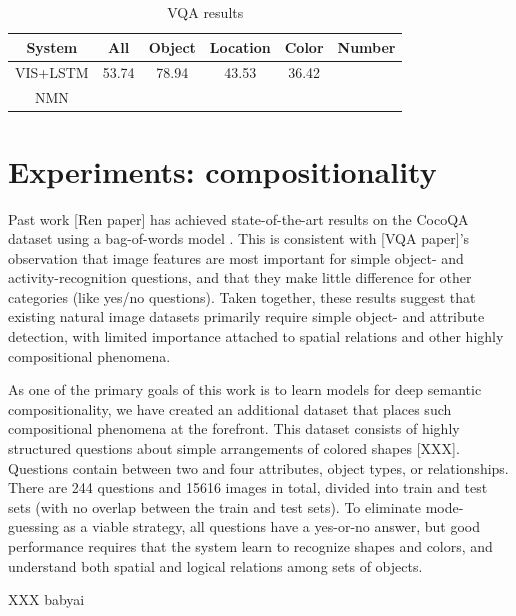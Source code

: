 \documentclass[10pt,twocolumn,letterpaper]{article}
\begin{document}
\begin{table}
  \footnotesize
  \center
  \begin{tabular}{cccccc}
    \toprule
    System & All & Object & Location & Color & Number \\
    \midrule
    VIS+LSTM & 53.74 & 78.94 & 43.53 & 36.42 & \\
    NMN \\
    \bottomrule
  \end{tabular}
  \caption{VQA results}
\end{table}


\section{Experiments: compositionality}

Past work [Ren paper] has achieved state-of-the-art results on the CocoQA
dataset using a bag-of-words model . This is consistent with [VQA paper]'s
observation that image features are most important for simple object- and
activity-recognition questions, and that they make little difference for other
categories (like yes/no questions). Taken together, these results suggest that
existing natural image datasets primarily require simple object- and attribute
detection, with limited importance attached to spatial relations and other
highly compositional phenomena.

As one of the primary goals of this work is to learn models for deep semantic
compositionality, we have created an additional dataset that places such
compositional phenomena at the forefront. This dataset consists of highly
structured questions about simple arrangements of colored shapes [XXX].
Questions contain between two and four attributes, object types, or
relationships.  There are 244 questions and 15616 images in total, divided into
train and test sets (with no overlap between the train and test sets).  To
eliminate mode-guessing as a viable strategy, all questions have a yes-or-no
answer, but good performance requires that the system learn to recognize shapes
and colors, and understand both spatial and logical relations among sets of
objects.

XXX babyai
\end{document}
